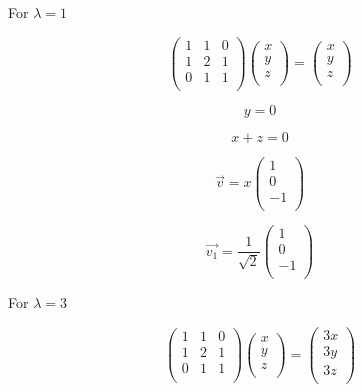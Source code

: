 \documentclass[12pt]{article}
\begin{document}
For \(\lambda = 1\)

\[
    \begin{pmatrix}
        1 & 1 & 0 \\
        1 & 2 & 1 \\
        0 & 1 & 1 \\
    \end{pmatrix} \begin{pmatrix}
        x \\
        y \\
        z \\
    \end{pmatrix} = \begin{pmatrix}
        x \\
        y \\
        z \\
    \end{pmatrix}
\]

\[
    y = 0
\]

\[
    x + z = 0
\]

\[
    \vec{v} = x \begin{pmatrix}
        1  \\
        0  \\
        -1 \\
    \end{pmatrix}
\]

\[
    \vec{v_1} = \frac{1}{\sqrt{2}} \begin{pmatrix}
        1  \\
        0  \\
        -1 \\
    \end{pmatrix}
\]

For \(\lambda = 3\)

\[
    \begin{pmatrix}
        1 & 1 & 0 \\
        1 & 2 & 1 \\
        0 & 1 & 1 \\
    \end{pmatrix} \begin{pmatrix}
        x \\
        y \\
        z \\
    \end{pmatrix} = \begin{pmatrix}
        3x \\
        3y \\
        3z \\
    \end{pmatrix}
\]
\end{document}
